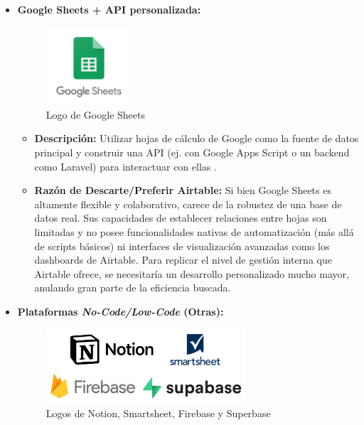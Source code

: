 \begin{enumerate}
\begin{itemize}
        \item \textbf{Google Sheets + API personalizada:}

        \begin{figure}[H]
            \begin{center}
                \includegraphics[width = 0.30\textwidth]{Figuras/logogooglesheets.png}
            \end{center}
            \caption{\label{fig:logogooglesheets} Logo de Google Sheets}
        \end{figure}
        
        \begin{itemize}
            \item \textbf{Descripción:} Utilizar hojas de cálculo de Google como la fuente de datos principal y construir una API (ej. con Google Apps Script o un backend como Laravel) para interactuar con ellas \cite{ionos2024sheets}.
            \item \textbf{Razón de Descarte/Preferir Airtable:} Si bien Google Sheets es altamente flexible y colaborativo, carece de la robustez de una base de datos real. Sus capacidades de establecer relaciones entre hojas son limitadas y no posee funcionalidades nativas de automatización (más allá de scripts básicos) ni interfaces de visualización avanzadas como los dashboards de Airtable. Para replicar el nivel de gestión interna que Airtable ofrece, se necesitaría un desarrollo personalizado mucho mayor, anulando gran parte de la eficiencia buscada.
        \end{itemize}

        \item \textbf{Plataformas \textit{No-Code/Low-Code} (Otras):}

        \begin{figure}[H]
            \begin{center}
                \includegraphics[width = 0.70\textwidth]{Figuras/logosnotionsmartsheetfirebasesuperbase.png}
            \end{center}
            \caption{\label{fig:logosnotionsmartsheetfirebasesuperbase} Logos de Notion, Smartsheet, Firebase y Superbase}
        \end{figure}
        

\end{itemize}
\end{enumerate}
